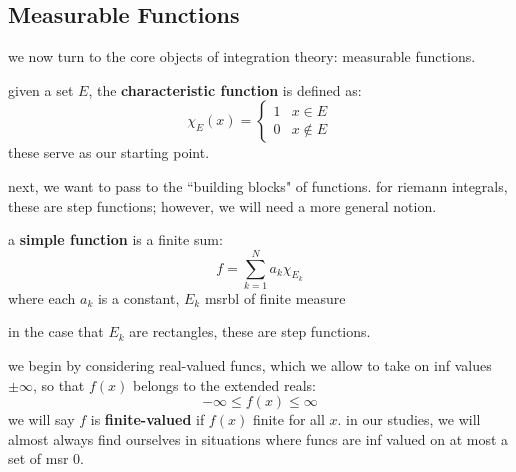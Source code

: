 \subsection{Measurable Functions}
we now turn to the core objects of integration theory: measurable functions.

\begin{defn}
    given a set $E$, the \textbf{characteristic function} is defined as:
    \begin{equation*}
        \chi_{E}(x) =
        \begin{cases}
            1 & x \in E \\ 0 & x \notin E
        \end{cases}
    \end{equation*}
    these serve as our starting point.
\end{defn}
next, we want to pass to the ``building blocks" of functions.
for riemann integrals, these are step functions;
however, we will need a more general notion.

\begin{defn}
    a \textbf{simple function} is a finite sum:
    \begin{equation*}
        f = \sum_{k=1}^{N}a_{k}\chi_{E_{k}}
    \end{equation*}
    where each $a_{k}$ is a constant, $E_{k}$ msrbl of finite measure
\end{defn}
in the case that $E_{k}$ are rectangles, these are step functions.

we begin by considering real-valued funcs, which we allow to
take on inf values $\pm \infty$, so that $f(x)$ belongs to the extended reals:
\begin{equation*}
    -\infty \leq f(x) \leq \infty
\end{equation*}
we will say $f$ is \textbf{finite-valued} if $f(x)$ finite for all $x$.
in our studies, we will almost always find ourselves in situations where
funcs are inf valued on at most a set of msr 0.

